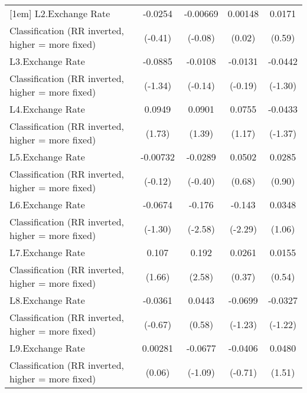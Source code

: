 {\begin{tabular}{l*{4}{c}}
[1em]
L2.Exchange Rate    &     -0.0254         &    -0.00669         &     0.00148         &      0.0171         \\
Classification (RR inverted, higher = more fixed)&     (-0.41)         &     (-0.08)         &      (0.02)         &      (0.59)         \\
[1em]
L3.Exchange Rate    &     -0.0885         &     -0.0108         &     -0.0131         &     -0.0442         \\
Classification (RR inverted, higher = more fixed)&     (-1.34)         &     (-0.14)         &     (-0.19)         &     (-1.30)         \\
[1em]
L4.Exchange Rate    &      0.0949         &      0.0901         &      0.0755         &     -0.0433         \\
Classification (RR inverted, higher = more fixed)&      (1.73)         &      (1.39)         &      (1.17)         &     (-1.37)         \\
[1em]
L5.Exchange Rate    &    -0.00732         &     -0.0289         &      0.0502         &      0.0285         \\
Classification (RR inverted, higher = more fixed)&     (-0.12)         &     (-0.40)         &      (0.68)         &      (0.90)         \\
[1em]
L6.Exchange Rate    &     -0.0674         &      -0.176\sym{**} &      -0.143\sym{*}  &      0.0348         \\
Classification (RR inverted, higher = more fixed)&     (-1.30)         &     (-2.58)         &     (-2.29)         &      (1.06)         \\
[1em]
L7.Exchange Rate    &       0.107         &       0.192\sym{**} &      0.0261         &      0.0155         \\
Classification (RR inverted, higher = more fixed)&      (1.66)         &      (2.58)         &      (0.37)         &      (0.54)         \\
[1em]
L8.Exchange Rate    &     -0.0361         &      0.0443         &     -0.0699         &     -0.0327         \\
Classification (RR inverted, higher = more fixed)&     (-0.67)         &      (0.58)         &     (-1.23)         &     (-1.22)         \\
[1em]
L9.Exchange Rate    &     0.00281         &     -0.0677         &     -0.0406         &      0.0480         \\
Classification (RR inverted, higher = more fixed)&      (0.06)         &     (-1.09)         &     (-0.71)         &      (1.51)         \\

\end{tabular}}
